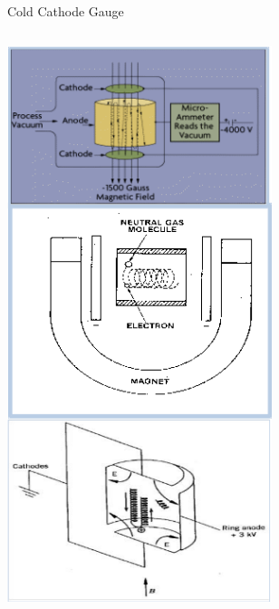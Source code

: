\documentclass[11pt]{beamer}
\begin{document}
\begin{frame}{Cold Cathode Gauge}


  \begin{columns}[]
    
      
       \begin{exampleblock}{}
         \begin{center}
			\includegraphics[width=0.95\textwidth]{ColdCathodeGauge1.png}
		\end{center}
       \end{exampleblock}
       

\end{columns}
\end{frame}
\end{document}
